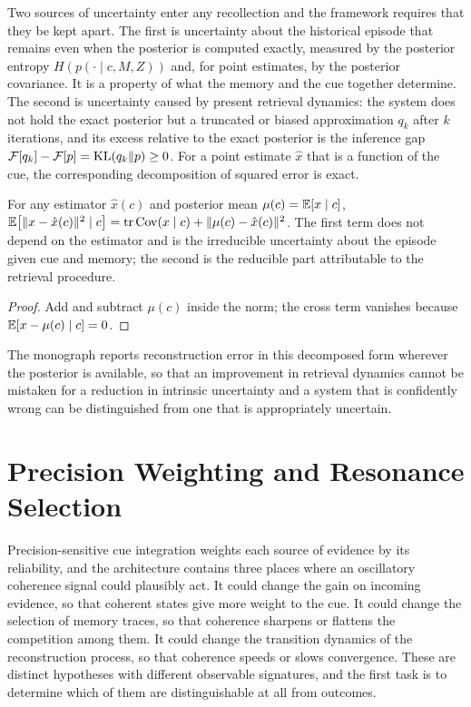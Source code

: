 Two sources of uncertainty enter any recollection and the framework requires that they be kept apart. The first is uncertainty about the historical episode that remains even when the posterior is computed exactly, measured by the posterior entropy $H(p(\cdot\mid c,M,Z))$ and, for point estimates, by the posterior covariance. It is a property of what the memory and the cue together determine. The second is uncertainty caused by present retrieval dynamics: the system does not hold the exact posterior but a truncated or biased approximation $q_k$ after $k$ iterations, and its excess relative to the exact posterior is the inference gap $\mathcal F[q_k]-\mathcal F[p]=\operatorname{KL}(q_k\Vert p)\ge0$. For a point estimate $\hat x$ that is a function of the cue, the corresponding decomposition of squared error is exact.

\begin{proposition}\label{prop:error}
For any estimator $\hat x(c)$ and posterior mean $\mu(c)=\mathbb{E}[x\mid c]$, $\mathbb{E}\bigl[\lVert x-\hat x(c)\rVert^2\mid c\bigr]=\operatorname{tr}\operatorname{Cov}(x\mid c)+\lVert \mu(c)-\hat x(c)\rVert^2$. The first term does not depend on the estimator and is the irreducible uncertainty about the episode given cue and memory; the second is the reducible part attributable to the retrieval procedure.
\end{proposition}

\begin{proof}
Add and subtract $\mu(c)$ inside the norm; the cross term vanishes because $\mathbb{E}[x-\mu(c)\mid c]=0$.
\end{proof}

The monograph reports reconstruction error in this decomposed form wherever the posterior is available, so that an improvement in retrieval dynamics cannot be mistaken for a reduction in intrinsic uncertainty and a system that is confidently wrong can be distinguished from one that is appropriately uncertain.

\chapter{Precision Weighting and Resonance Selection}\label{ch:precision}

Precision-sensitive cue integration weights each source of evidence by its reliability, and the architecture contains three places where an oscillatory coherence signal could plausibly act. It could change the gain on incoming evidence, so that coherent states give more weight to the cue. It could change the selection of memory traces, so that coherence sharpens or flattens the competition among them. It could change the transition dynamics of the reconstruction process, so that coherence speeds or slows convergence. These are distinct hypotheses with different observable signatures, and the first task is to determine which of them are distinguishable at all from outcomes.

